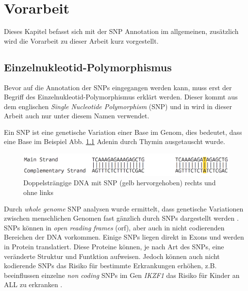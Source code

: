 \chapter{Vorarbeit}

Dieses Kapitel befasst sich mit der SNP Annotation im allgemeinen, zusätzlich wird die Vorarbeit zu dieser Arbeit kurz vorgestellt.




\section{Einzelnukleotid-Polymorphismus}
Bevor auf die Annotation der SNPs eingegangen werden kann, muss erst der Begriff des Einzelnukleotid-Polymorphismus erklärt werden. Dieser kommt aus dem englischen \emph{Single Nucleotide Polymorphism} (SNP) und in wird in dieser Arbeit auch nur unter diesem Namen verwendet.

Ein SNP ist eine genetische Variation einer Base im Genom, dies bedeutet, dass eine Base im Beispiel Abb. \ref{fig:snp} Adenin durch Thymin ausgetauscht wurde.

\begin{figure}
\centering
\includegraphics[width=.95\textwidth]{images/DNA_ds_strand_with_snp.png}
\caption{Doppelsträngige DNA mit SNP (gelb hervorgehoben) rechts und ohne links}
\label{fig:snp}
\end{figure}



Durch \emph{whole genome} SNP analysen wurde ermittelt, dass genetische Variationen zwischen menschlichen Genomen fast gänzlich durch SNPs dargestellt werden \cite{Do.2015}. 
SNPs können in \emph{open reading frames} (orf), aber auch in nicht codierenden Bereichen der DNA vorkommen. Einige SNPs liegen direkt in Exons und werden in Protein translatiert. Diese Proteine können, je nach Art des SNPs, eine veränderte Struktur und Funtktion aufweisen. Jedoch können auch nicht kodierende SNPs das Risiko für bestimmte Erkrankungen erhöhen, z.B. beeinflussen einzelne \emph{non coding} SNPs im Gen \emph{IKZF1} das Risiko für Kinder an ALL zu erkranken \cite{Papaemmanuil.2009}.

